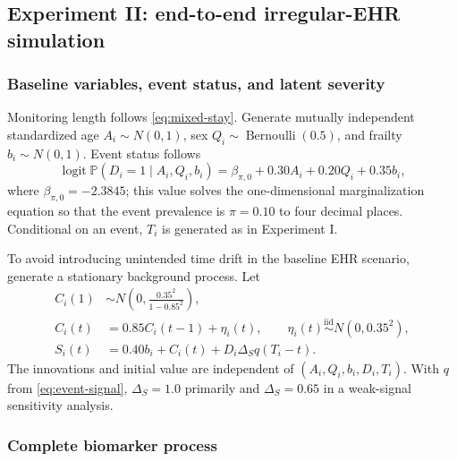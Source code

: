 \documentclass[11pt]{article}
\newcommand{\Pp}{\mathbb{P}}
\newcommand{\logit}{\operatorname{logit}}
\begin{document}
\subsection{Experiment II: end-to-end irregular-EHR simulation}\label{subsec:sim-ehr}

\subsubsection{Baseline variables, event status, and latent severity}

Monitoring length follows \eqref{eq:mixed-stay}. Generate mutually independent standardized age $A_i\sim N(0,1)$, sex $Q_i\sim\operatorname{Bernoulli}(0.5)$, and frailty $b_i\sim N(0,1)$. Event status follows
\begin{equation}
\logit\Pp(D_i=1\mid A_i,Q_i,b_i)
=\beta_{\pi,0}+0.30A_i+0.20Q_i+0.35b_i,
\label{eq:event-status-dgp}
\end{equation}
where $\beta_{\pi,0}=-2.3845$; this value solves the one-dimensional marginalization equation so that the event prevalence is $\pi=0.10$ to four decimal places. Conditional on an event, $T_i$ is generated as in Experiment I.

To avoid introducing unintended time drift in the baseline EHR scenario, generate a stationary background process. Let
\begin{align}
C_i(1)&\sim N\!\left(0,\frac{0.35^2}{1-0.85^2}\right),\nonumber\\
C_i(t)&=0.85C_i(t-1)+\eta_i(t),
\qquad \eta_i(t)\stackrel{\mathrm{iid}}{\sim}N(0,0.35^2),\nonumber\\
S_i(t)&=0.40b_i+C_i(t)+D_i\Delta_S q(T_i-t).
\label{eq:severity-dgp}
\end{align}
The innovations and initial value are independent of $(A_i,Q_i,b_i,D_i,T_i)$. With $q$ from \eqref{eq:event-signal}, $\Delta_S=1.0$ primarily and $\Delta_S=0.65$ in a weak-signal sensitivity analysis.

\subsubsection{Complete biomarker process}
\end{document}
